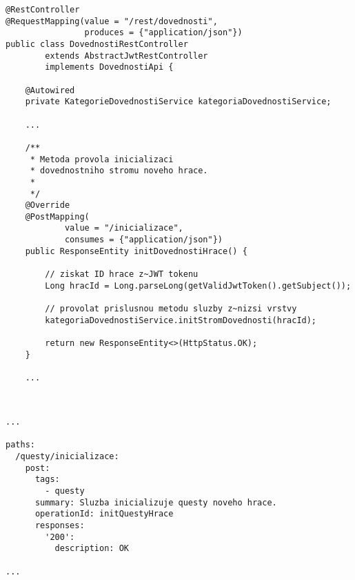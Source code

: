 \documentclass[12pt]{article}
\begin{document}

\begin{lstlisting}
@RestController
@RequestMapping(value = "/rest/dovednosti",
                produces = {"application/json"})
public class DovednostiRestController 
        extends AbstractJwtRestController 
        implements DovednostiApi {

    @Autowired
    private KategorieDovednostiService kategoriaDovednostiService;
    
    ...

    /**
     * Metoda provola inicializaci
     * dovednostniho stromu noveho hrace.
     * 
     */
    @Override
    @PostMapping(
            value = "/inicializace",
            consumes = {"application/json"})
    public ResponseEntity initDovednostiHrace() {
        
        // ziskat ID hrace z~JWT tokenu
        Long hracId = Long.parseLong(getValidJwtToken().getSubject());

        // provolat prislusnou metodu sluzby z~nizsi vrstvy
        kategoriaDovednostiService.initStromDovednosti(hracId);
        
        return new ResponseEntity<>(HttpStatus.OK);
    }
    
    ...
    
\end{lstlisting}




\begin{lstlisting}

...

paths:
  /questy/inicializace:
    post:
      tags:
        - questy
      summary: Sluzba inicializuje questy noveho hrace.
      operationId: initQuestyHrace
      responses:
        '200':
          description: OK
          
...

\end{lstlisting}

\end{document}
